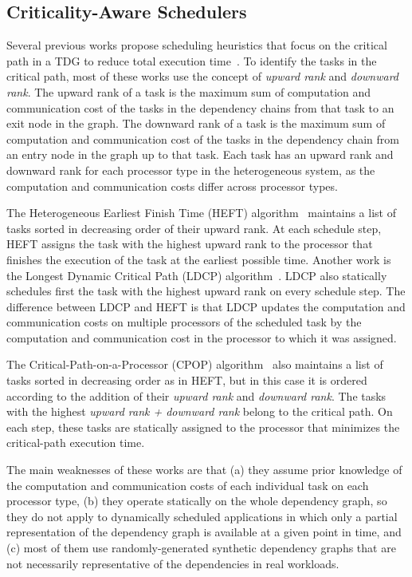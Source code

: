 \subsection{Criticality-Aware Schedulers}
\label{sec.relwork_critical}

Several previous works propose scheduling heuristics that focus on the critical path in a TDG to reduce total execution time~\cite{DCPS, LDCP, HEFT, CrPathDup}. To identify the tasks in the critical path, most of these works use the concept of \textit{upward rank} and \textit{downward rank}. The upward rank of a task is the maximum sum of computation and communication cost of the tasks in the dependency chains from that task to an exit node in the graph. The downward rank of a task is the maximum sum of computation and communication cost of the tasks in the dependency chain from an entry node in the graph up to that task. Each task has an upward rank and downward rank for each processor type in the heterogeneous system, as the computation and communication costs differ across processor types.

The Heterogeneous Earliest Finish Time (HEFT) algorithm~\cite{HEFT} maintains a list of tasks sorted in decreasing order of their upward rank. At each schedule step, HEFT assigns the task with the highest upward rank to the processor that finishes the execution of the task at the earliest possible time. Another work is the Longest Dynamic Critical Path (LDCP) algorithm~\cite{LDCP}. LDCP also statically schedules first the task with the highest upward rank on every schedule step. The difference between LDCP and HEFT is that LDCP updates the computation and communication costs on multiple processors of the scheduled task by the computation and communication cost in the processor to which it was assigned.

The Critical-Path-on-a-Processor (CPOP) algorithm~\cite{HEFT} also maintains a list of tasks sorted in decreasing order as in HEFT, but in this case it is ordered according to the addition of their \textit{upward rank} and \textit{downward rank}. The tasks with the highest \textit{upward rank + downward rank} belong to the critical path. On each step, these tasks are statically assigned to the processor that minimizes the critical-path execution time.


The main weaknesses of these works are that (a) they assume prior knowledge of the computation and communication costs of each individual task on each processor type, (b) they operate statically on the whole dependency graph, so they do not apply to dynamically scheduled applications in which only a partial representation of the dependency graph is available at a given point in time, and (c) most of them use randomly-generated synthetic dependency graphs that are not necessarily representative of the dependencies in real workloads.

